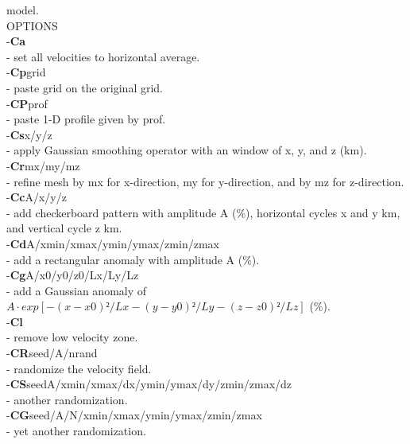 \documentclass[twoside,final,onecolumn]{article}
\newcommand{\forceindent}{\leavevmode{\parindent=1em\indent}}
\begin{document}
\forceindent model.\\[6pt]
OPTIONS \\
\forceindent -\textbf{Ca} \\
\forceindent\forceindent - set all velocities to horizontal average.\\[6pt]
\forceindent -\textbf{Cp}grid \\
\forceindent\forceindent - paste grid on the original grid.\\[6pt]
\forceindent-\textbf{CP}prof \\
\forceindent\forceindent - paste 1-D profile given by prof.\\[6pt]
\forceindent -\textbf{Cs}x/y/z \\
\forceindent\forceindent - apply Gaussian smoothing operator with an window of x, y, and z (km).\\[6pt]
\forceindent -\textbf{Cr}mx/my/mz \\
\forceindent\forceindent - refine mesh by mx for x-direction, my for y-direction, and by mz for z-direction.\\[6pt]
\forceindent -\textbf{Cc}A/x/y/z \\
\forceindent\forceindent - add checkerboard pattern with amplitude A (\%), horizontal cycles x and y km, and vertical cycle z km.\\[6pt]
\forceindent -\textbf{Cd}A/xmin/xmax/ymin/ymax/zmin/zmax \\
\forceindent\forceindent - add a rectangular anomaly with amplitude A (\%).\\[6pt]
\forceindent -\textbf{Cg}A/x0/y0/z0/Lx/Ly/Lz \\
\forceindent\forceindent - add a Gaussian anomaly of \(A \cdot exp[-(x-x0)²/Lx-(y-y0)²/Ly-(z-z0)²/Lz]\) (\%).\\[6pt]
\forceindent -\textbf{Cl} \\
\forceindent\forceindent - remove low velocity zone.\\[6pt]
\forceindent -\textbf{CR}seed/A/nrand \\ 
\forceindent\forceindent - randomize the velocity field.\\[6pt]
\forceindent -\textbf{CS}seedA/xmin/xmax/dx/ymin/ymax/dy/zmin/zmax/dz \\
\forceindent\forceindent - another randomization.\\[6pt]
\forceindent -\textbf{CG}seed/A/N/xmin/xmax/ymin/ymax/zmin/zmax \\
\forceindent\forceindent - yet another randomization.\\[6pt]
\end{document}

